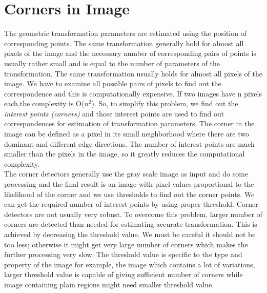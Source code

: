 \section{Corners in Image}
\label{sec:corners-in-image}
The geometric transformation parameters are estimated using the position of corresponding points. The same transformation generally hold for almost all pixels of the image and the necessary number of corresponding pairs of points is usually rather small and is equal to the number of parameters of the transformation. The same transformation usually holds for almost all pixels of the image. We have to examine all possible pairs of pixels to find out the correspondence and this is computationally expensive. If two images have n pixels each,the complexity is O($n^2$). So, to simplify this problem, we find out the \emph{interest points (corners)} and those interest points are used to find out correspondences for estimation of transformation parameters. The corner in the image can be defined as a pixel in its small neighborhood where there are two dominant and different edge directions\cite{Sonka:08}. The number of interest points are much smaller than the pixels in the image, so it greatly reduces the computational complexity.\\

\noindent The corner detectors generally use the gray scale image as input and do some processing and the final result is an image with pixel values proportional to the likelihood of the corner and we use thresholds to find out the corner points. We can get the required number of interest points by using proper threshold. Corner detectors are not usually very robust. To overcome this problem, larger number of corners are detected than needed for estimating accurate transformation. This is achieved by decreasing the threshold value. We must be careful it should not be too less; otherwise it might get very large number of corners which makes the further processing very slow. The threshold value is specific to the type and property of the image for example, the image which contains a lot of variations, larger threshold value is capable of giving sufficient number of corners while image containing plain regions might need smaller threshold value.

